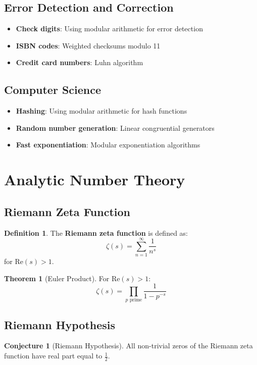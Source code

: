 \documentclass[11pt]{article}
\theoremstyle{definition}
\newtheorem{definition}{Definition}[section]
\newtheorem{theorem}{Theorem}[section]
\newtheorem{conjecture}{Conjecture}[section]
\begin{document}
\subsection{Error Detection and Correction}
\begin{itemize}
    \item \textbf{Check digits}: Using modular arithmetic for error detection
    \item \textbf{ISBN codes}: Weighted checksums modulo 11
    \item \textbf{Credit card numbers}: Luhn algorithm
\end{itemize}

\subsection{Computer Science}
\begin{itemize}
    \item \textbf{Hashing}: Using modular arithmetic for hash functions
    \item \textbf{Random number generation}: Linear congruential generators
    \item \textbf{Fast exponentiation}: Modular exponentiation algorithms
\end{itemize}

\section{Analytic Number Theory}

\subsection{Riemann Zeta Function}
\begin{definition}
The \textbf{Riemann zeta function} is defined as:
$$\zeta(s) = \sum_{n=1}^{\infty} \frac{1}{n^s}$$
for $\text{Re}(s) > 1$.
\end{definition}

\begin{theorem}[Euler Product]
For $\text{Re}(s) > 1$:
$$\zeta(s) = \prod_{p \text{ prime}} \frac{1}{1 - p^{-s}}$$
\end{theorem}

\subsection{Riemann Hypothesis}
\begin{conjecture}[Riemann Hypothesis]
All non-trivial zeros of the Riemann zeta function have real part equal to $\frac{1}{2}$.
\end{conjecture}
\end{document}
